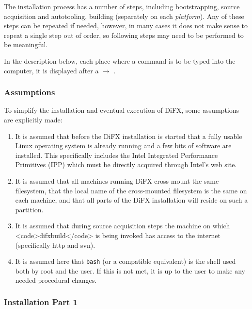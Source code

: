 The installation process has a number of steps, including bootstrapping, source acquisition and autotooling, building (separately on each {\em platform}).
Any of these steps can be repeated if needed, however, in many cases it does not make sense to repeat a single step out of order, so following steps may need to be performed to be meaningful.

In the description below, each place where a command is to be typed into the computer, it is displayed after a $\longrightarrow$ .

\subsubsection{Assumptions}

To simplify the installation and eventual execution of DiFX, some assumptions are explicitly made:

\begin{enumerate}

\item It is assumed that before the DiFX installation is started that a fully usable Linux operating system is already running and a few bits of software are installed.
This specifically includes the Intel Integrated Performance Primitives (IPP) which must be directly acquired through Intel's web site.

\item It is assumed that all machines running DiFX cross mount the same filesystem, that the local name of the cross-mounted filesystem is the same on each machine, and that all parts of the DiFX installation will reside on such a partition.

\item It is assumed that during source acquisition steps the machine on which <code>difxbuild</code> is being invoked has access to the internet (specifically http and svn).

\item It is assumed here that {\tt bash} (or a compatible equivalent) is the shell used both by root and the user.
If this is not met, it is up to the user to make any needed procedural changes.

\end{enumerate}

\subsubsection{Installation Part 1}

